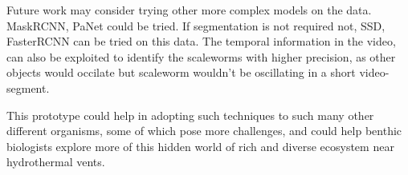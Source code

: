 \documentclass[10pt,twocolumn,letterpaper]{article}
\begin{document}
Future work may consider trying other more complex models on the data. MaskRCNN, PaNet could be tried. If segmentation is not required not, SSD, FasterRCNN can be tried on this data. The temporal information in the video, can also be exploited to identify the scaleworms with higher precision, as other objects would occilate but scaleworm wouldn't be oscillating in a short video-segment.

This prototype could help in adopting such techniques to such many other different organisms, some of which pose more challenges, and could help benthic biologists explore more of this hidden world of rich and diverse ecosystem near hydrothermal vents.


{\small


}
\end{document}

